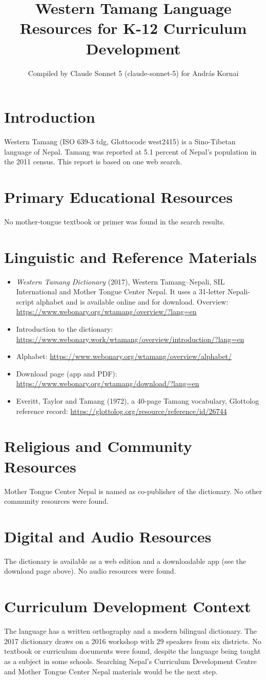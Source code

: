 \documentclass[12pt]{article}
\title{Western Tamang Language Resources for K-12 Curriculum Development}
\author{Compiled by Claude Sonnet 5 (claude-sonnet-5) for Andr\'as Kornai}
\date{}
\begin{document}
\maketitle
\section{Introduction}
Western Tamang (ISO 639-3 tdg, Glottocode west2415) is a Sino-Tibetan language of Nepal. Tamang was reported at 5.1 percent of Nepal's population in the 2011 census. This report is based on one web search.
\section{Primary Educational Resources}
No mother-tongue textbook or primer was found in the search results.
\section{Linguistic and Reference Materials}
\begin{itemize}
\item \emph{Western Tamang Dictionary} (2017), Western Tamang--Nepali, SIL International and Mother Tongue Center Nepal. It uses a 31-letter Nepali-script alphabet and is available online and for download. Overview: \url{https://www.webonary.org/wtamang/overview/?lang=en}
\item Introduction to the dictionary: \url{https://www.webonary.work/wtamang/overview/introduction/?lang=en}
\item Alphabet: \url{https://www.webonary.org/wtamang/overview/alphabet/}
\item Download page (app and PDF): \url{https://www.webonary.org/wtamang/download/?lang=en}
\item Everitt, Taylor and Tamang (1972), a 40-page Tamang vocabulary, Glottolog reference record: \url{https://glottolog.org/resource/reference/id/26744}
\end{itemize}
\section{Religious and Community Resources}
Mother Tongue Center Nepal is named as co-publisher of the dictionary. No other community resources were found.
\section{Digital and Audio Resources}
The dictionary is available as a web edition and a downloadable app (see the download page above). No audio resources were found.
\section{Curriculum Development Context}
The language has a written orthography and a modern bilingual dictionary. The 2017 dictionary draws on a 2016 workshop with 29 speakers from six districts. No textbook or curriculum documents were found, despite the language being taught as a subject in some schools. Searching Nepal's Curriculum Development Centre and Mother Tongue Center Nepal materials would be the next step.
\end{document}
